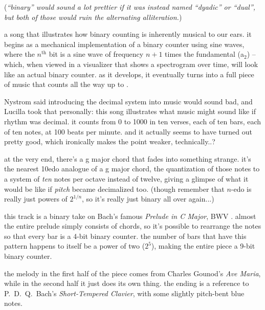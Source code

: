 \documentclass[a4paper, 12pt]{report}
\begin{document}
({\it ``binary'' would sound a lot prettier if it was instead named ``dyadic'' or ``dual'', but both of those would ruin the alternating alliteration.})

\restoregeometry

\newpage


a song that illustrates how binary counting is inherently musical to our ears. it begins as a mechanical implementation of a binary counter using sine waves, where the $n^{\text{th}}$ bit is a sine wave of frequency $n + 1$ times the fundamental ({\sc a$_2$}) -- which, when viewed in a visualizer that shows a spectrogram over time, will look like an actual binary counter. as it develops, it eventually turns into a full piece of music that counts all the way up to \io\jz\jo\jo\io\jo\jo\jo\io.


Nystrom said introducing the decimal system into music would sound bad, and Lucilla took that personally: this song illustrates what music might sound like if rhythm was decimal. it counts from 0 to 1000 in ten verses, each of ten bars, each of ten notes, at 100 beats per minute. and it actually seems to have turned out pretty good, which ironically makes the point weaker, technically..?

at the very end, there’s a {\sc g} major chord that fades into something strange. it’s the nearest 10edo analogue of a {\sc g} major chord, the quantization of those notes to a system of \emph{ten} notes per octave instead of twelve, giving a glimpse of what it would be like if \emph{pitch} became decimalized too. (though remember that $n$-edo is really just powers of $2^{1/n}$, so it’s really just binary all over again...)


this track is a binary take on Bach’s famous {\it Prelude in C Major}, BWV \jo\io\jz\jo\jz\iz\jo\jo\jo\iz. almost the entire prelude simply consists of chords, so it's possible to rearrange the notes so that every bar is a 4-bit binary counter. the number of bars that have this pattern happens to itself be a power of two ($2^5$), making the entire piece a 9-bit binary counter.

the melody in the first half of the piece comes from Charles Gounod's {\it Ave Maria}, while in the second half it just does its own thing. the ending is a reference to P.~D.~Q.~Bach’s {\it Short-Tempered Clavier}, with some slightly pitch-bent blue notes.
\end{document}
